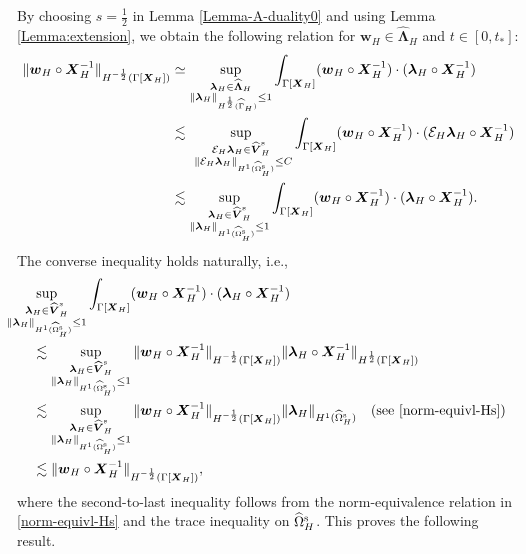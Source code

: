 \documentclass[11pt,reqno]{amsart}
\theoremstyle{definition}
\theoremstyle{plain}
\numberwithin{theorem}{section}
\numberwithin{proposition}{section}
\numberwithin{lemma}{section}
\numberwithin{equation}{section}
\newcommand{\bs}[1]{\boldsymbol{#1}}
\renewcommand{\(}{\bigl(}
\renewcommand{\)}{\bigr)}
\begin{document}
By choosing $s=\frac12$ in Lemma \ref{Lemma-A-duality0} and using Lemma \ref{Lemma:extension}, we obtain the following relation for ${\bs w}_H\in \widehat{\bs\Lambda}_H $ and $t\in[0,t_*]$: 
\begin{align*}
\|{\bs w}_H\circ{\bs X}_H^{-1}\|_{H^{-\frac12}(\Gamma[{\bs X}_H])}
&\simeq
\sup_{\substack{{\bs\lambda}_H\in \widehat{\bs\Lambda}_H\\ \|{\bs\lambda}_H\|_{H^{\frac12}(\widehat\Gamma_H)}\le 1}} \int_{\Gamma[{\bs X}_H]} ({\bs w}_H\circ{\bs X}_H^{-1}) \cdot ({\bs\lambda}_H\circ{\bs X}_H^{-1} ) \\
&\lesssim
\sup_{\substack{\mathcal{E}_H{\bs\lambda}_H\in \widehat{\bs V}^{\rm s}_H\\\ \|\mathcal{E}_H{\bs\lambda}_H\|_{H^1(\widehat\Omega^{\rm s}_H)}\le C}} \int_{\Gamma[{\bs X}_H]} ({\bs w}_H\circ{\bs X}_H^{-1}) \cdot (\mathcal{E}_H{\bs\lambda}_H\circ{\bs X}_H^{-1} ) \\
&\lesssim
\sup_{\substack{{\bs\lambda}_H\in \widehat{\bs V}^{\rm s}_H\\ \|{\bs\lambda}_H\|_{H^1(\widehat\Omega^{\rm s}_H)}\le 1}} \int_{\Gamma[{\bs X}_H]} ({\bs w}_H\circ{\bs X}_H^{-1}) \cdot ({\bs\lambda}_H\circ{\bs X}_H^{-1} ) .
\end{align*}
The converse inequality holds naturally, i.e., 
\begin{align*}
&\hspace{-20pt}\sup_{\substack{{\bs\lambda}_H\in \widehat{\bs V}^{\rm s}_H\\ \|{\bs\lambda}_H\|_{H^1(\widehat\Omega^{\rm s}_H)}\le 1}} \int_{\Gamma[{\bs X}_H]} ({\bs w}_H\circ{\bs X}_H^{-1}) \cdot ({\bs\lambda}_H\circ{\bs X}_H^{-1} ) \\
&\lesssim
\sup_{\substack{{\bs\lambda}_H\in \widehat{\bs V}^{\rm s}_H\\ \|{\bs\lambda}_H\|_{H^1(\widehat\Omega^{\rm s}_H)}\le 1}} \|{\bs w}_H\circ{\bs X}_H^{-1}\|_{H^{-\frac12}(\Gamma[{\bs X}_H])}
\|{\bs \lambda}_H\circ{\bs X}_H^{-1}\|_{H^{\frac12}(\Gamma[{\bs X}_H])} \\
&\lesssim
\sup_{\substack{{\bs\lambda}_H\in \widehat{\bs V}^{\rm s}_H\\ \|{\bs\lambda}_H\|_{H^1(\widehat\Omega^{\rm s}_H)}\le 1}} \|{\bs w}_H\circ{\bs X}_H^{-1}\|_{H^{-\frac12}(\Gamma[{\bs X}_H])}
\|{\bs \lambda}_H\|_{H^1(\widehat\Omega^{\rm s}_H)} 
\quad\mbox{(see \eqref{norm-equivl-Hs})}\\
&\lesssim
\|{\bs w}_H\circ{\bs X}_H^{-1}\|_{H^{-\frac12}(\Gamma[{\bs X}_H])} ,
\end{align*}
where the second-to-last inequality follows from the norm-equivalence relation in \eqref{norm-equivl-Hs} and the trace inequality on $\widehat\Omega^{\rm s}_H$. This proves the following result. 
\end{document}
